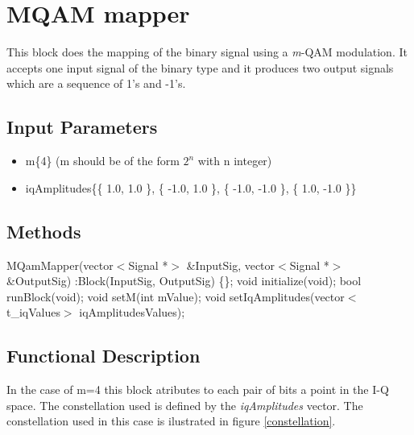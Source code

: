 \clearpage

\section{MQAM mapper}

This block does the mapping of the binary signal using a \textit{m}-QAM modulation. It accepts one input signal of the binary type and it produces two output signals which are a sequence of 1's and -1's.

\subsection*{Input Parameters}

\begin{itemize}
	\item m\{4\} \linebreak
	(m should be of the form $2^n$ with n integer)
	\item iqAmplitudes\{\{ 1.0, 1.0 \}, \{ -1.0, 1.0 \}, \{ -1.0, -1.0 \}, \{ 1.0, -1.0 \}\} \linebreak
	
\end{itemize}

\subsection*{Methods}

MQamMapper(vector$<$Signal *$>$ \&InputSig, vector$<$Signal *$>$ \&OutputSig) :Block(InputSig, OutputSig) \{\};
\bigbreak	
void initialize(void);
\bigbreak	
bool runBlock(void);
\bigbreak	
void setM(int mValue);
\bigbreak	
void setIqAmplitudes(vector$<$t\_iqValues$>$ iqAmplitudesValues);

\subsection*{Functional Description}

In the case of m=4 this block atributes to each pair of bits a point in the I-Q space. The constellation used is defined by the \textit{iqAmplitudes} vector. The constellation used in this case is ilustrated in figure \ref{constellation}.

